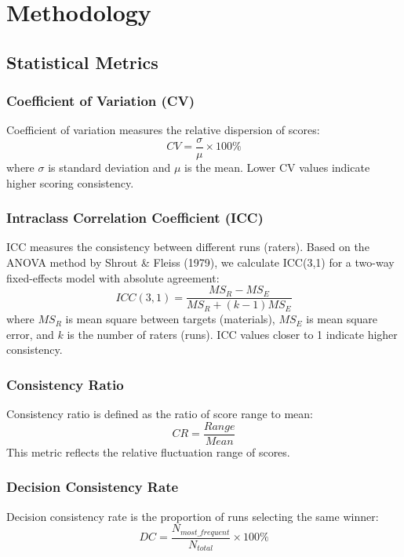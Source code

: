 \documentclass[12pt,a4paper]{article}
\begin{document}
\newpage


\section{Methodology}

\subsection{Statistical Metrics}

\subsubsection{Coefficient of Variation (CV)}
Coefficient of variation measures the relative dispersion of scores:
\begin{equation}
    CV = \frac{\sigma}{\mu} \times 100\%
\end{equation}
where $\sigma$ is standard deviation and $\mu$ is the mean. Lower CV values indicate higher scoring consistency.

\subsubsection{Intraclass Correlation Coefficient (ICC)}
ICC measures the consistency between different runs (raters). Based on the ANOVA method by Shrout \& Fleiss (1979), we calculate ICC(3,1) for a two-way fixed-effects model with absolute agreement:
\begin{equation}
    ICC(3,1) = \frac{MS_R - MS_E}{MS_R + (k-1)MS_E}
\end{equation}
where $MS_R$ is mean square between targets (materials), $MS_E$ is mean square error, and $k$ is the number of raters (runs). ICC values closer to 1 indicate higher consistency.

\subsubsection{Consistency Ratio}
Consistency ratio is defined as the ratio of score range to mean:
\begin{equation}
    CR = \frac{Range}{Mean}
\end{equation}
This metric reflects the relative fluctuation range of scores.

\subsubsection{Decision Consistency Rate}
Decision consistency rate is the proportion of runs selecting the same winner:
\begin{equation}
    DC = \frac{N_{most\_frequent}}{N_{total}} \times 100\%
\end{equation}
\end{document}
